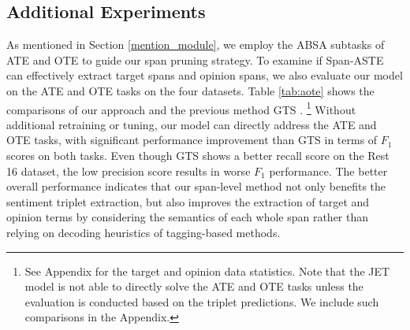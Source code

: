 \documentclass[11pt,a4paper]{article}
\begin{document}
\subsection{Additional Experiments}
As mentioned in Section \ref{mention_module}, we employ the ABSA subtasks of ATE and OTE to guide our span pruning strategy. 
To examine if 
Span-ASTE can effectively extract target spans and opinion spans, we also evaluate our model on the ATE and OTE tasks on the four datasets.
Table \ref{tab:aote} shows the comparisons of our approach and the previous method GTS \cite{wu-etal-2020-grid}. \footnote{See Appendix for the target and opinion data statistics.
Note that the JET model \cite{Xu2020PositionAwareTF} is not able to directly solve the ATE and OTE tasks unless the evaluation is conducted based on the triplet predictions.
We include such comparisons in the Appendix.}
Without additional retraining or tuning,
our model can directly address the ATE and OTE tasks, with significant performance improvement than GTS in terms of $F_1$ scores on both tasks.
Even though GTS shows a better recall score on the Rest 16 dataset, the low precision score results in 
worse $F_1$ performance.
The better overall performance indicates that our span-level method not only benefits the sentiment triplet extraction,
but also improves the extraction of target and opinion terms by considering the semantics of each whole span rather than relying on decoding heuristics of tagging-based methods.
\end{document}
